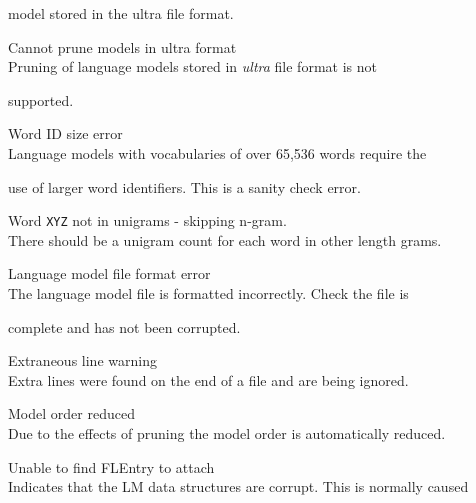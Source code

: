 \begin{itemize}
\begin{itemize}
        model stored in the ultra file format.


   Cannot prune models in ultra format\\


        Pruning of language models stored in {\em ultra} file format is not


        supported.


   Word ID size error\\


        Language models with vocabularies of over 65,536 words require the


        use of larger word identifiers. This is a sanity check error.


   Word \texttt{XYZ} not in unigrams - skipping n-gram.\\


        There should be a unigram count for each word in other length grams.


   Language model file format error\\


        The language model file is formatted incorrectly. Check the file is


        complete and has not been corrupted.


   Extraneous line warning\\


        Extra lines were found on the end of a file and are being ignored.


   Model order reduced\\


        Due to the effects of pruning the model order is automatically reduced.


\end{itemize}















\begin{itemize}


   Unable to find FLEntry to attach\\


        Indicates that the LM data structures are corrupt. This is normally caused



\end{itemize}
\end{itemize}
